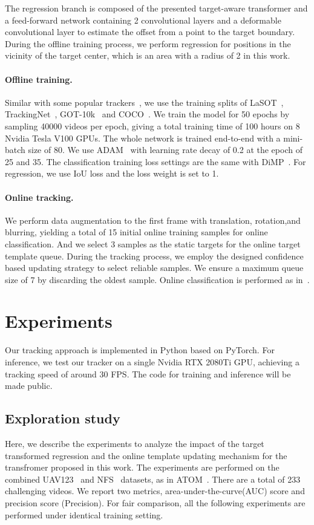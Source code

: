 \documentclass[10pt,twocolumn,letterpaper]{article}
\begin{document}
The regression branch is composed of the presented target-aware transformer and a feed-forward network containing 2 convolutional layers and a deformable convolutional layer to estimate the offset from a point to the target boundary. During the offline training process, we perform regression for positions in the vicinity of the target center, which is an area with a radius of 2 in this work.


\paragraph{Offline training.}
Similar with some popular trackers~\cite{dimp,prdimp,atom,fcot}, we use the training splits of LaSOT~\cite{lasot}, TrackingNet~\cite{trackingnet}, GOT-10k~\cite{got10k} and COCO~\cite{coco}. We train the model for 50 epochs by sampling 40000 videos per epoch, giving a total training time of 100 hours on 8 Nvidia Tesla V100 GPUs. The whole network is trained end-to-end with a mini-batch size of 80.
We use ADAM~\cite{adam} with learning rate decay of 0.2 at the epoch of 25 and 35. The classification training loss settings are the same with DiMP~\cite{dimp}. For regression, we use IoU loss and the loss weight is set to 1.


\paragraph{Online tracking.} We perform data augmentation to the first frame with translation, rotation,and blurring, yielding a total of 15 initial online training samples for online classification. And we select 3 samples as the static targets for the online target template queue. During the tracking process, we employ the designed confidence based updating strategy to select reliable samples. We ensure a maximum queue size of 7 by discarding the oldest sample. Online classification is performed as in~\cite{fcot}.


\section{Experiments}

Our tracking approach is implemented in Python based on PyTorch. For inference, we test our tracker on a single Nvidia RTX 2080Ti GPU, achieving a tracking speed of around 30 FPS. The code for training and inference will be made public. 


\subsection{Exploration study}\label{analysis}
Here, we describe the experiments to analyze the impact of the target transformed regression and the online template updating mechanism for the transfromer proposed in this work. The experiments are performed on the combined UAV123~\cite{uav123} and NFS~\cite{nfs} datasets, as in ATOM~\cite{atom}. There are a total of 233 challenging videos. We report two metrics, area-under-the-curve(AUC) score and precision score (Precision). For fair comparison, all the following experiments are performed under identical training setting.
\end{document}
